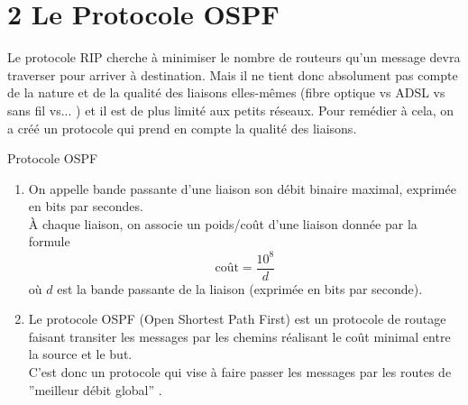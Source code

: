 \documentclass[11pt,a4paper,french,twoside]{PMCours}
\begin{document}
\section*{2 Le Protocole OSPF}
Le protocole RIP cherche à minimiser le nombre de routeurs qu'un message devra traverser pour arriver à destination. Mais il ne tient donc absolument pas compte de la nature et de la qualité des liaisons elles-mêmes (fibre optique vs ADSL vs sans fil vs... ) et il est de plus limité aux petits réseaux. Pour remédier à cela, on a créé un protocole qui prend en compte la qualité des liaisons.

\medskip
\begin{Definition}{Protocole OSPF}
\begin{enumerate}
\item On appelle {\color{red}bande passante} d'une liaison son débit binaire maximal, exprimée en bits par secondes.\\
\`A chaque liaison, on associe un {\color{red}poids/coût} d'une liaison donnée par la formule 
$$\mbox{coût}=\frac {10^8}{d}$$ 
où $d$ est la bande passante de la liaison (exprimée en bits par seconde).
\item Le protocole OSPF (Open Shortest Path First) est un protocole de routage faisant transiter les messages par les chemins réalisant le coût minimal entre la source et le but. \\
C'est donc un protocole qui vise à faire passer les messages par les routes de ''meilleur débit global'' . \end{enumerate}
\end{Definition}
\end{document}
